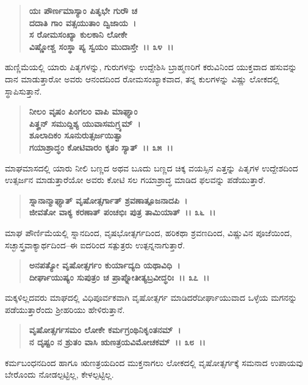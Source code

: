 \begin{verse}
\textbf{ಯಃ ಪೌರ್ಣಮಾಸ್ಯಾಂ ಪಿತೃಭೇ ಗುರೌ‌ ಚ} \\\textbf{ದದಾತಿ ಗಾಂ ವತ್ಸಯುತಾಂ ದ್ವಿಜಾಯ~।}\\\textbf{ಸ ರೋಮಸಂಖ್ಯಾ ಕುಲಕಾನಿ ಲೋಕೇ} \\\textbf{ವಿಷ್ಣೋಶ್ಚ ಸಂಸ್ಥಾ ಪ್ಯ ಸ್ವಯಂ ಮುದಾಸ್ತೇ~।। ೩೪~।।}
\end{verse}

ಹುಣ್ಣಿಮೆಯಲ್ಲಿ ಯಾರು ಪಿತೃಗಳನ್ನು, ಗುರುಗಳನ್ನು ಉದ್ದೇಶಿಸಿ ಬ್ರಾಹ್ಮಣರಿಗೆ ಕರುವಿ\-ನಿಂದ ಯುಕ್ತವಾದ ಹಸುವನ್ನು ದಾನ ಮಾಡುತ್ತಾರೋ ಅವರು ಆನಂದದಿಂದ ರೋಮ\-ಸಂಖ್ಯಾಕವಾದ, ತನ್ನ ಕುಲಗಳನ್ನು ವಿಷ್ಣು ಲೋಕದಲ್ಲಿ ಸ್ಥಾಪಿಸುತ್ತಾನೆ.

\begin{verse}
\textbf{ನೀಲಂ ವೃಷಂ ಪಿಂಗಲಂ ವಾಪಿ ಮಾಘ್ಯಾಂ} \\\textbf{ಪಿತೄನ್ ಸಮುದ್ದಿಶ್ಯ ಯುವಾಸಮಗ್ರ್ಯಮ್~।}\\\textbf{ಶೂಲಾದಿಕಂ ಸೂನುರುತ್ಸರ್ಜಯಿತ್ವಾ} \\\textbf{ಗಯಾಶ್ರಾದ್ಧಂ ಕೋಟಿವಾರಂ ಕೃತಂ ಸ್ಯಾತ್~।। ೩೫~।।}
\end{verse}

ಮಾಘಮಾಸದಲ್ಲಿ ಯಾರು ನೀಲಿ ಬಣ್ಣದ ಅಥವ ಬೂದು ಬಣ್ಣದ ಚಿಕ್ಕ ವಯಸ್ಸಿನ ಎತ್ತನ್ನು ಪಿತೃಗಳ ಉದ್ದೇಶದಿಂದ ಉತ್ಸರ್ಜನ ಮಾಡುತ್ತಾರೆಯೋ ಅವರು ಕೋಟಿ ಸಲ ಗಯಾಶ್ರಾದ್ಧ ಮಾಡಿದ ಫಲವನ್ನು ಪಡೆಯುತ್ತಾರೆ.

\begin{verse}
\textbf{ಸ್ನಾನಾನ್ಮಾಘ್ಯಾತ್ ವೃಷೋತ್ಸರ್ಗಾತ್ ಶ್ರವಣಾತ್ಪೂಜನಾದಪಿ~।}\\\textbf{ಜೀವತೋ ವಾಕ್ಯ ಕರಣಾತ್ ಪಂಚಭಿಃ ಪುತ್ರ ತಾಮಿಯಾತ್~।। ೩೬~।।}
\end{verse}

ಮಾಘ ಪೌರ್ಣಿಮೆಯಲ್ಲಿ ಸ್ನಾನದಿಂದ, ವೃಷಭೋತ್ಸರ್ಗದಿಂದ, ಹರಿಕಥಾ ಶ್ರವಣದಿಂದ, ವಿಷ್ಣುವಿನ ಪೂಜೆಯಿಂದ, ಸಚ್ಛಾಸ್ತ್ರವಾಕ್ಯಾರ್ಥದಿಂದ–ಈ ಐದರಿಂದ ಸತ್ಪುತ್ರರು ಉತ್ಪನ್ನ\-ನಾಗುತ್ತಾರೆ.

\begin{verse}
\textbf{ಅನಪತ್ಯೋ ವೃಷೋತ್ಸರ್ಗಂ ಕುರ್ಯಾದ್ಯದಿ ಯಥಾವಿಧಿ~।}\\\textbf{ದೀರ್ಘಾಯುಷ್ಯಂ ಸುಪುತ್ರಂ ಚ ಪ್ರಾಪ್ನೋತೀತ್ಯಬ್ರವೀದ್ಧರಿಃ~।। ೩೭~।।}
\end{verse}

ಮಕ್ಕಳಿಲ್ಲದವರು ಮಾಘದಲ್ಲಿ ವಿಧಿಪೂರ್ವಕವಾಗಿ ವೃಷೋತ್ಸರ್ಗ ಮಾಡಿದರೆ\break ದೀರ್ಘಾಯುವಾದ ಒಳ್ಳೆಯ ಮಗನನ್ನು ಪಡೆಯುತ್ತಾರೆಂದು ಶ‍್ರೀಹರಿಯು ಹೇಳಿರುತ್ತಾನೆ.

\begin{verse}
\textbf{ವೃಷೋತ್ಸರ್ಗಸಮಂ ಲೋಕೇ ಕರ್ಮಗ್ರಂಥಿನಿಕೃಂತನಮ್~।}\\\textbf{ನ ದೃಷ್ಟಂ ನ ಶ್ರುತಂ ವಾಸಿ ಋಣತ್ರಯವಿಮೋಚಕಮ್~।। ೩೮~।।}
\end{verse}

ಕರ್ಮಬಂಧನದಿಂದ ಹಾಗೂ ಋಣತ್ರಯದಿಂದ ಮುಕ್ತನಾಗಲು ಲೋಕದಲ್ಲಿ ವೃಷೋ\-ತ್ಸರ್ಗಕ್ಕೆ ಸಮನಾದ ಉಪಾಯವು ಬೇರೊಂದು ನೋಡಲ್ಪಟ್ಟಿಲ್ಲ, ಕೇಳಲ್ಪಟ್ಟಿಲ್ಲ.


